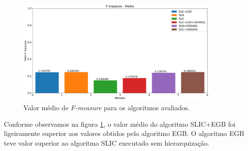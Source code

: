 \begin{document}

\begin{figure}[ht]
\centering
\includegraphics[width=0.9\textwidth]{fmeasure_avg.png}
\caption{Valor médio de \textit{F-measure} para os algoritmos avaliados.}
\label{fig:FMEASURE_AVG}
\end{figure}

Conforme observamos na figura \ref{fig:FMEASURE_AVG}, o valor médio do algoritmo SLIC+EGB foi ligeiramente superior aos valores obtidos pelo algoritmo EGB. O algoritmo EGB teve valor superior ao algoritmo SLIC executado sem hierarquização. 
\end{document}
